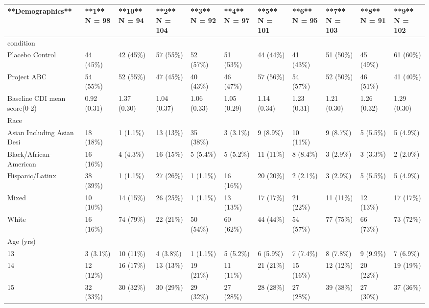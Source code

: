 \begin{table}[ht]
\centering
\begin{tabular}{lllllllllll}
  \hline
**Demographics** & **1**  
N = 98 & **10**  
N = 94 & **2**  
N = 104 & **3**  
N = 92 & **4**  
N = 97 & **5**  
N = 101 & **6**  
N = 95 & **7**  
N = 103 & **8**  
N = 91 & **9**  
N = 102 \\ 
  \hline
condition &  &  &  &  &  &  &  &  &  &  \\ 
  Placebo Control & 44 (45\%) & 42 (45\%) & 57 (55\%) & 52 (57\%) & 51 (53\%) & 44 (44\%) & 41 (43\%) & 51 (50\%) & 45 (49\%) & 61 (60\%) \\ 
  Project ABC & 54 (55\%) & 52 (55\%) & 47 (45\%) & 40 (43\%) & 46 (47\%) & 57 (56\%) & 54 (57\%) & 52 (50\%) & 46 (51\%) & 41 (40\%) \\ 
  Baseline CDI mean score(0-2) & 0.92 (0.31) & 1.37 (0.30) & 1.04 (0.37) & 1.06 (0.33) & 1.05 (0.29) & 1.14 (0.34) & 1.23 (0.31) & 1.21 (0.30) & 1.26 (0.32) & 1.29 (0.30) \\ 
  Race &  &  &  &  &  &  &  &  &  &  \\ 
  Asian Including Asian Desi & 18 (18\%) & 1 (1.1\%) & 13 (13\%) & 35 (38\%) & 3 (3.1\%) & 9 (8.9\%) & 10 (11\%) & 9 (8.7\%) & 5 (5.5\%) & 5 (4.9\%) \\ 
  Black/African-American & 16 (16\%) & 4 (4.3\%) & 16 (15\%) & 5 (5.4\%) & 5 (5.2\%) & 11 (11\%) & 8 (8.4\%) & 3 (2.9\%) & 3 (3.3\%) & 2 (2.0\%) \\ 
  Hispanic/Latinx & 38 (39\%) & 1 (1.1\%) & 27 (26\%) & 1 (1.1\%) & 16 (16\%) & 20 (20\%) & 2 (2.1\%) & 3 (2.9\%) & 5 (5.5\%) & 5 (4.9\%) \\ 
  Mixed & 10 (10\%) & 14 (15\%) & 26 (25\%) & 1 (1.1\%) & 13 (13\%) & 17 (17\%) & 21 (22\%) & 11 (11\%) & 12 (13\%) & 17 (17\%) \\ 
  White & 16 (16\%) & 74 (79\%) & 22 (21\%) & 50 (54\%) & 60 (62\%) & 44 (44\%) & 54 (57\%) & 77 (75\%) & 66 (73\%) & 73 (72\%) \\ 
  Age (yrs) &  &  &  &  &  &  &  &  &  &  \\ 
  13 & 3 (3.1\%) & 10 (11\%) & 4 (3.8\%) & 1 (1.1\%) & 5 (5.2\%) & 6 (5.9\%) & 7 (7.4\%) & 8 (7.8\%) & 9 (9.9\%) & 7 (6.9\%) \\ 
  14 & 12 (12\%) & 16 (17\%) & 13 (13\%) & 19 (21\%) & 11 (11\%) & 21 (21\%) & 15 (16\%) & 12 (12\%) & 20 (22\%) & 19 (19\%) \\ 
  15 & 32 (33\%) & 30 (32\%) & 30 (29\%) & 29 (32\%) & 27 (28\%) & 28 (28\%) & 27 (28\%) & 39 (38\%) & 27 (30\%) & 37 (36\%) \\ 

\end{tabular}
\end{table}
